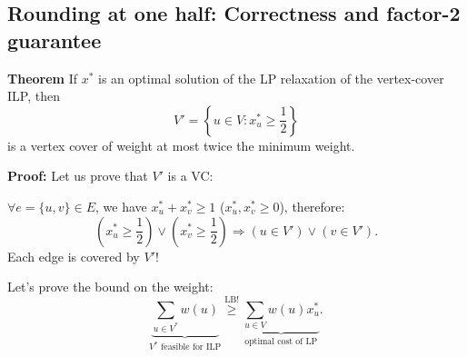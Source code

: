 \subsection{Rounding at one half: Correctness and factor-2 guarantee}
\begin{notestheorem}
\textbf{Theorem} If $x^*$ is an optimal solution of the LP relaxation of the vertex-cover ILP, then
\[V'=\left\{u\in V:x_u^*\geq\frac12\right\}\]
is a vertex cover of weight at most twice the minimum weight.
\end{notestheorem}
\textbf{Proof:} Let us prove that $V'$ is a VC:

$\forall e=\{u,v\}\in E$, we have $x_u^*+x_v^*\geq1$ ($x_u^*,x_v^*\geq0$), therefore:
\[\left(x_u^*\geq\frac12\right)\lor\left(x_v^*\geq\frac12\right)
\Rightarrow(u\in V')\lor(v\in V').\]
Each edge is covered by $V'$!

Let's prove the bound on the weight:
\[\underbrace{\sum_{u\in V^*}w(u)}_{V^*\text{ feasible for ILP}}\overset{\mathrm{LB!}}\geq
\underbrace{\sum_{u\in V}w(u)x_u^*}_{\text{optimal cost of LP}}.\]
